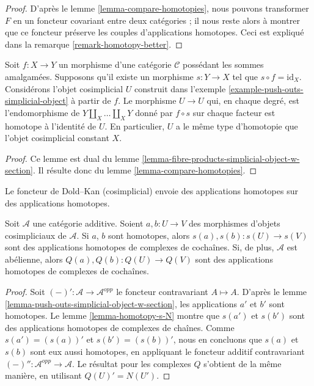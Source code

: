 \begin{proof}
D'après le lemme \ref{lemma-compare-homotopies}, nous pouvons transformer
$F$ en un foncteur covariant entre deux catégories ; il nous reste alors à
montrer que ce foncteur préserve les couples d'applications homotopes.
Ceci est expliqué dans la remarque \ref{remark-homotopy-better}.
\end{proof}

\begin{lemma}
\label{lemma-push-outs-simplicial-object-w-section}
Soit $f : X \to Y$ un morphisme d'une catégorie $\mathcal{C}$ possédant les
sommes amalgamées. Supposons qu'il existe un morphisme $s : Y \to X$ tel que
$s \circ f = \text{id}_X$. Considérons l'objet cosimplicial $U$ construit dans
l'exemple \ref{example-push-outs-simplicial-object} à partir de $f$.
Le morphisme $U \to U$ qui, en chaque degré, est l'endomorphisme de
$Y \amalg_X \ldots \amalg_X Y$ donné par $f \circ s$ sur chaque facteur
est homotope à l'identité de $U$. En particulier, $U$ a le même type
d'homotopie que l'objet cosimplicial constant $X$.
\end{lemma}

\begin{proof}
Ce lemme est dual du
lemme \ref{lemma-fibre-products-simplicial-object-w-section}.
Il résulte donc du lemme \ref{lemma-compare-homotopies}.
\end{proof}

\begin{lemma}
\label{lemma-homotopy-s-Q}
\begin{slogan}
Le foncteur de Dold--Kan (cosimplicial) envoie des applications homotopes sur des applications homotopes.
\end{slogan}
Soit $\mathcal{A}$ une catégorie additive. Soient $a, b : U \to V$ des
morphismes d'objets cosimpliciaux de $\mathcal{A}$. Si $a$, $b$ sont
homotopes, alors $s(a), s(b) : s(U) \to s(V)$ sont des applications homotopes
de complexes de cochaînes. Si, de plus, $\mathcal{A}$ est abélienne, alors
$Q(a), Q(b) : Q(U) \to Q(V)$ sont des applications homotopes de complexes de cochaînes.
\end{lemma}

\begin{proof}
Soit $(-)' : \mathcal{A} \to \mathcal{A}^{opp}$ le foncteur contravariant
$A \mapsto A$. D'après le lemme \ref{lemma-push-outs-simplicial-object-w-section}, les
applications $a'$ et $b'$ sont homotopes.
Le lemme \ref{lemma-homotopy-s-N} montre que $s(a')$ et $s(b')$ sont des
applications homotopes de complexes de chaînes. Comme
$s(a') = (s(a))'$ et $s(b') = (s(b))'$, nous en concluons que
$s(a)$ et $s(b)$ sont eux aussi homotopes, en appliquant le foncteur additif
contravariant $(-)'' : \mathcal{A}^{opp} \to \mathcal{A}$.
Le résultat pour les complexes $Q$ s'obtient de la même manière,
en utilisant $Q(U)' = N(U')$.
\end{proof}

